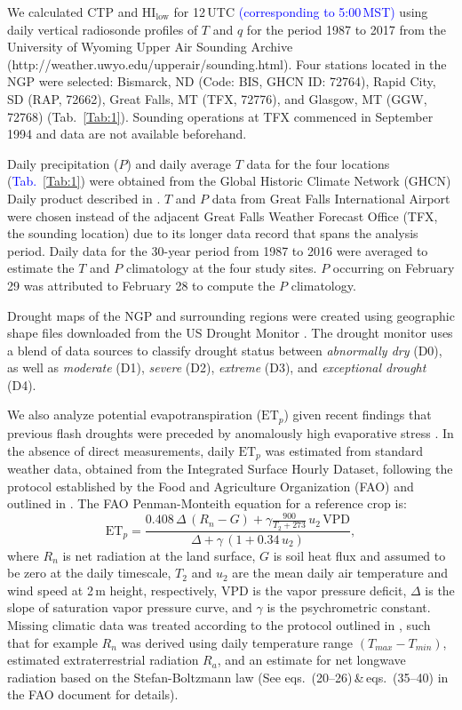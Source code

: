 \documentclass[hess, manuscript]{copernicus}
\def\TG{\textcolor{blue}}
\begin{document}
We calculated CTP and $\mathrm{HI_{low}}$ for 12\,UTC \TG{(corresponding to 5:00\,MST)}  using daily vertical radiosonde profiles of $T$ and $q$ for the period 1987 to 2017 from the University of Wyoming Upper Air Sounding Archive (http://weather.uwyo.edu/upperair/sounding.html). Four stations located in the NGP were selected: Bismarck, ND (Code: BIS, GHCN ID: 72764), Rapid City, SD (RAP, 72662), Great Falls, MT (TFX, 72776), and Glasgow, MT (GGW, 72768) (Tab.~\ref{Tab:1}). Sounding operations at TFX commenced in September 1994 and data are not available beforehand.  

Daily precipitation ($P$) and daily average $T$ data for the four locations (\TG{Tab.}~\ref{Tab:1}) were obtained from the Global Historic Climate Network (GHCN) Daily product described in \citet{Menne_2012b, Menne_2012a}. $T$ and $P$ data from Great Falls International Airport were chosen instead of the adjacent Great Falls Weather Forecast Office (TFX, the sounding location) due to its longer data record that spans the analysis period. Daily data for the 30-year period from 1987 to 2016 were averaged to estimate the $T$ and $P$ climatology at the four study sites. $P$ occurring on February 29 was attributed to February 28 to compute the $P$ climatology.

Drought maps of the NGP and surrounding regions were created using geographic shape files downloaded from the US Drought Monitor \citep{Svoboda_2002}. The drought monitor uses a blend of data sources to classify drought status between \emph{abnormally dry} (D0), as well as \emph{moderate} (D1), \emph{severe} (D2), \emph{extreme} (D3), and \emph{exceptional drought} (D4).

We also analyze potential evapotranspiration ($\mathrm{ET}_p$) given recent findings that previous flash droughts were preceded by anomalously high evaporative stress \citep{Otkin_2016, Ford_2017}. In the absence of direct measurements, daily $\mathrm{ET}_p$ was estimated from standard weather data, obtained from the Integrated Surface Hourly Dataset, following the protocol established by the Food and Agriculture Organization (FAO) and outlined in \citet{Allen_1998}. The FAO Penman-Monteith equation for a reference crop is:
%
\begin{equation}
\mathrm{ET}_p = \frac{0.408\,\Delta\,(R_n - G) +\gamma \frac{900}{T_2+273}\,u_2\,\mathrm{VPD}}{\Delta + \gamma\,(1+0.34\,u_2)}, 
\end{equation}
%
where $R_n$ is net radiation at the land surface, $G$ is soil heat flux and assumed to be zero at the daily timescale, $T_2$ and $u_2$ are the mean daily air temperature and wind speed at 2\,m height, respectively, VPD is the vapor pressure deficit, $\Delta$ is the slope of saturation vapor pressure curve, and $\gamma$ is the psychrometric constant. Missing climatic data was treated according to the protocol outlined in \citet{Allen_1998}, such that for example $R_n$ was derived using daily temperature range $(T_{max}-T_{min})$, estimated extraterrestrial radiation $R_a$, and an estimate for net longwave radiation based on the Stefan-Boltzmann law (See eqs.~(20--26)\,\&\,eqs.~(35--40) in the FAO document \citep{Allen_1998} for details). 
\end{document}
